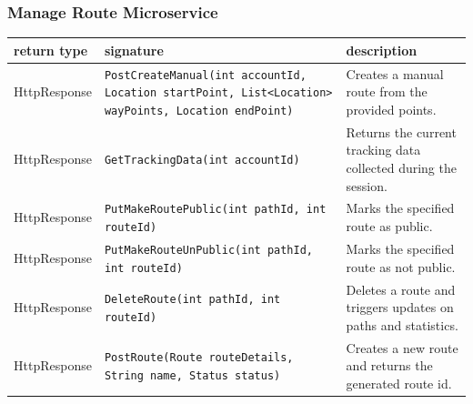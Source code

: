 \subsubsection{Manage Route Microservice}
\begin{table}[H]
\centering
\small
\begin{tabularx}{\textwidth}{|L{3cm}|L{6.5cm}|Y|}
\hline
\textbf{return type} & \textbf{signature} & \textbf{description} \\
\hline
HttpResponse & \texttt{PostCreateManual(int accountId, Location startPoint, List<Location> wayPoints, Location endPoint)} & Creates a manual route from the provided points. \\
\hline
HttpResponse & \texttt{GetTrackingData(int accountId)} & Returns the current tracking data collected during the session. \\
\hline
HttpResponse & \texttt{PutMakeRoutePublic(int pathId, int routeId)} & Marks the specified route as public. \\
\hline
HttpResponse & \texttt{PutMakeRouteUnPublic(int pathId, int routeId)} & Marks the specified route as not public. \\
\hline
HttpResponse & \texttt{DeleteRoute(int pathId, int routeId)} & Deletes a route and triggers updates on paths and statistics. \\ \hline
HttpResponse & \texttt{PostRoute(Route routeDetails, String name, Status status)} & Creates a new route and returns the generated route id. \\
\hline
\end{tabularx}
\end{table}
\newpage
